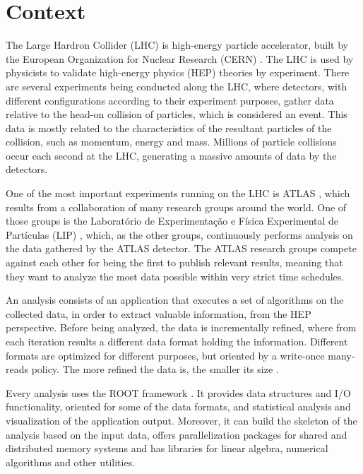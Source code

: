 \section{Context}

The Large Hardron Collider (LHC) \cite{CERN:LHC} is high-energy particle accelerator, built by the European Organization for Nuclear Research (CERN) \cite{CERN}. The LHC is used by physicists to validate high-energy physics (HEP) theories by experiment. There are several experiments being conducted along the LHC, where detectors, with different configurations according to their experiment purposes, gather data relative to the head-on collision of particles, which is considered an event. This data is mostly related to the characteristics of the resultant particles of the collision, such as momentum, energy and mass. Millions of particle collisions occur each second at the LHC, generating a massive amounts of data by the detectors.

One of the most important experiments running on the LHC is ATLAS \cite{CERN:ATLAS}, which results from a collaboration of many research groups around the world. One of those groups is the Laboratório de Experimentação e Física Experimental de Partículas (LIP) \cite{LIP}, which, as the other groups, continuously performs analysis on the data gathered by the ATLAS detector. The ATLAS research groups compete against each other for being the first to publish relevant results, meaning that they want to analyze the most data possible within very strict time schedules.

An analysis consists of an application that executes a set of algorithms on the collected data, in order to extract valuable information, from the HEP perspective. Before being analyzed, the data is incrementally refined, where from each iteration results a different data format holding the information. Different formats are optimized for different purposes, but oriented by a write-once many-reads policy. The more refined the data is, the smaller its size \cite{CERN:ATLAS:DATA}.

Every analysis uses the ROOT framework \cite{CERN:ROOT}. It provides data structures and I/O functionality, oriented for some of the data formats, and statistical analysis and visualization of the application output. Moreover, it can build the skeleton of the analysis based on the input data, offers parallelization packages for shared and distributed memory systems and has libraries for linear algebra, numerical algorithms and other utilities.

